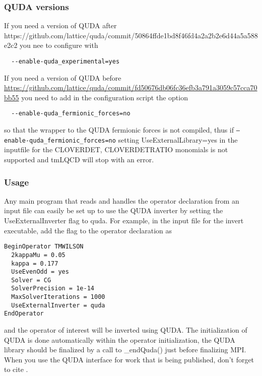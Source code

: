 \subsubsection{QUDA versions}

If you need a version of QUDA after https://github.com/lattice/quda/commit/50864ffde1bd8f46fd4a2a2b2e6d44a5a588e2c2 you nee to configure with 
\begin{verbatim}
  --enable-quda_experimental=yes
\end{verbatim}

If you need a version of QUDA before \url{https://github.com/lattice/quda/commit/fd50676db06fc36efb3a791a3059c57cca70bb55} you need to add in the configuration script the option
\begin{verbatim}
  --enable-quda_fermionic_forces=no
\end{verbatim}
so that the wrapper to the QUDA fermionic forces is not compiled,
thus if \texttt{--enable-quda_fermionic_forces=no} setting {\ttfamily UseExternalLibrary=yes} in the inputfile for the {\ttfamily  CLOVERDET, CLOVERDETRATIO} monomials
is not supported and tmLQCD will stop with an error.


\subsubsection{Usage}
Any main program that reads and handles the operator declaration from an input file can easily be set up to use the QUDA inverter by setting the {\ttfamily UseExternalInverter} flag to {\ttfamily quda}. For example, in the input file for the {\ttfamily invert} executable, add the flag to the operator declaration as
\begin{verbatim}
BeginOperator TMWILSON
  2kappaMu = 0.05
  kappa = 0.177
  UseEvenOdd = yes
  Solver = CG
  SolverPrecision = 1e-14
  MaxSolverIterations = 1000
  UseExternalInverter = quda
EndOperator
\end{verbatim}
and the operator of interest will be inverted using QUDA. The initialization of QUDA is done automatically within the operator initialization,  the QUDA library should be finalized by a call to {\ttfamily \_endQuda()} just before finalizing MPI. When you use the QUDA interface for work that is being published, don't forget to cite \cite{Clark:2009wm, Babich:2011np, Strelchenko:2013vaa}.

